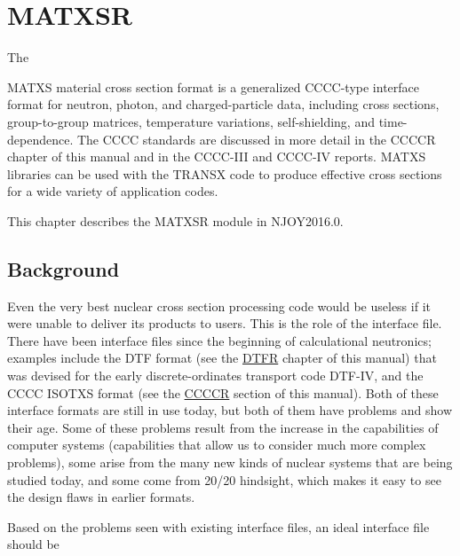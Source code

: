 \section{MATXSR}
\label{sMATXSR}

\hypertarget{sMATXSRhy}{The}
MATXS material cross section format is
a generalized CCCC-type interface format for
neutron, photon, and charged-particle data, including cross sections,
group-to-group matrices, temperature variations, self-shielding,
and time-dependence.  The CCCC standards are discussed in more
detail in the CCCCR chapter of this manual and in the
CCCC-III and CCCC-IV
reports\cite{CCCC3,CCCC4}.  MATXS libraries
can be used with the TRANSX code\cite{TRANSX,TRANSX2}
to produce effective cross sections for a wide variety of application
codes.

This chapter describes the MATXSR module in NJOY2016.0.

\subsection{Background}
\label{ssMATXSR_back}

Even the very best nuclear cross section processing code would be useless
if it were unable to deliver its products to users.  This is the role of
the interface file.  There have been interface files since the beginning
of calculational neutronics; examples include the DTF format (see the
\hyperlink{sDTFRhy}{DTFR} chapter of this manual) that was devised
for the early discrete-ordinates transport code DTF-IV\cite{DTF},
 and the CCCC ISOTXS
format\cite{CCCC4} (see the \hyperlink{sCCCCRhy}{CCCCR}
section of this manual).  Both of these interface formats are still
in use today, but both of them have problems and show their age.  Some
of these problems result from the increase in the capabilities of
computer systems (capabilities that allow us to consider much more
complex problems), some arise from the many new kinds of nuclear systems
that are being studied today, and some come from 20/20 hindsight, which
makes it easy to see the design flaws in earlier formats.

Based on the problems seen with existing interface files, an
ideal interface file should be

